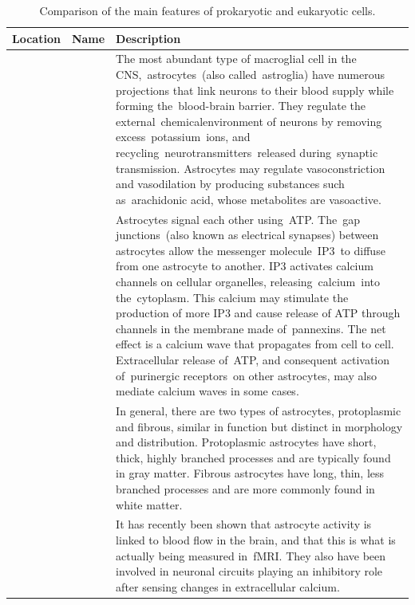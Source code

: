 \begin{longtable}[t]{>{\raggedright\arraybackslash}p{5em}>{\raggedright\arraybackslash}p{5em}>{\raggedright\arraybackslash}p{40em}}
\caption{\label{tab:macroglia}Comparison of the main features of prokaryotic and eukaryotic cells.}\\
\toprule
Location & Name & Description\\
\midrule
\rowcolor{gray!6}   &  & The most abundant type of macroglial cell in the CNS, astrocytes (also called astroglia) have numerous projections that link neurons to their blood supply while forming the blood-brain barrier. They regulate the external chemicalenvironment of neurons by removing excess potassium ions, and recycling neurotransmitters released during synaptic transmission. Astrocytes may regulate vasoconstriction and vasodilation by producing substances such as arachidonic acid, whose metabolites are vasoactive.\\

 &  & Astrocytes signal each other using ATP. The gap junctions (also known as electrical synapses) between astrocytes allow the messenger molecule IP3 to diffuse from one astrocyte to another. IP3 activates calcium channels on cellular organelles, releasing calcium into the cytoplasm. This calcium may stimulate the production of more IP3 and cause release of ATP through channels in the membrane made of pannexins. The net effect is a calcium wave that propagates from cell to cell. Extracellular release of ATP, and consequent activation of purinergic receptors on other astrocytes, may also mediate calcium waves in some cases.\\

\rowcolor{gray!6}   &  & In general, there are two types of astrocytes, protoplasmic and fibrous, similar in function but distinct in morphology and distribution. Protoplasmic astrocytes have short, thick, highly branched processes and are typically found in gray matter. Fibrous astrocytes have long, thin, less branched processes and are more commonly found in white matter.\\

 & \multirow{-4}{5em}{\raggedright\arraybackslash Astrocytes} & It has recently been shown that astrocyte activity is linked to blood flow in the brain, and that this is what is actually being measured in fMRI. They also have been involved in neuronal circuits playing an inhibitory role after sensing changes in extracellular calcium.\\


\end{longtable}
